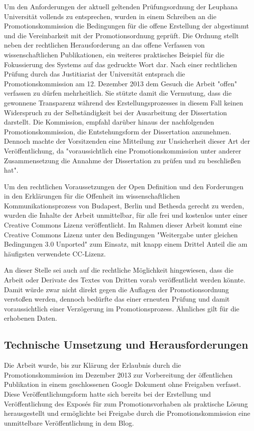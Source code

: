 Um den Anforderungen der aktuell geltenden Prüfungsordnung der Leuphana Universität vollends zu entsprechen, wurden in einem Schreiben an die Promotionskommission die Bedingungen für die offene Erstellung der abgestimmt und die Vereinbarkeit mit der Promotionsordnung geprüft. Die Ordnung stellt neben der rechtlichen Herausforderung an das offene Verfassen von wissenschaftlichen Publikationen, ein weiteres praktisches Beispiel für die Fokussierung des Systems auf das gedruckte Wort dar. Nach einer rechtlichen Prüfung durch das Justitiariat der Universität entsprach die Promotionskommission am 12. Dezember 2013 dem Gesuch die Arbeit "offen" verfassen zu dürfen mehrheitlich. Sie stützte damit die Vermutung, dass die gewonnene Transparenz während des Erstellungsprozesses in diesem Fall keinen Widerspruch zu der Selbständigkeit bei der Ausarbeitung der Dissertation darstellt. Die Kommission, empfahl darüber hinaus der nachfolgenden Promotionskommission, die Entstehungsform der Dissertation anzunehmen. Dennoch machte der Vorsitzenden eine Mitteilung zur Unsicherheit dieser Art der Veröffentlichung, da "voraussichtlich eine Promotionskommission unter anderer Zusammensetzung die Annahme der Dissertation zu prüfen und zu beschließen hat".

Um den rechtlichen Voraussetzungen der Open Definition und den Forderungen in den Erklärungen für die Offenheit im wissenschaftlichen Kommunikationsprozess von Budapest, Berlin und Bethesda gerecht zu werden, wurden die Inhalte der Arbeit unmittelbar, für alle frei und kostenlos unter einer Creative Commons Lizenz veröffentlicht. Im Rahmen dieser Arbeit kommt eine Creative Commons Lizenz unter den Bedingungen "Weitergabe unter gleichen Bedingungen 3.0 Unported" zum Einsatz, mit knapp einem Drittel Anteil die am häufigsten verwendete CC-Lizenz.

An dieser Stelle sei auch auf die rechtliche Möglichkeit hingewiesen, dass die Arbeit oder Derivate des Textes von Dritten vorab veröffentlicht werden könnte. Damit würde zwar nicht direkt gegen die Auflagen der Promotionsordnung verstoßen werden, dennoch bedürfte das einer erneuten Prüfung und damit voraussichtlich einer Verzögerung im Promotionsprozess. Ähnliches gilt für die erhobenen Daten.

\subsection{Technische Umsetzung und Herausforderungen}

Die Arbeit wurde, bis zur Klärung der Erlaubnis durch die Promotionskommission im Dezember 2013 zur Vorbereitung der öffentlichen Publikation in einem geschlossenen Google Dokument ohne Freigaben verfasst. Diese Veröffentlichungsform hatte sich bereits bei der Erstellung und Veröffentlichung des Exposés für zum Promotionsvorhaben \cite{heise_2012_expose} als praktische Lösung herausgestellt und ermöglichte bei Freigabe durch die Promotionskommission eine unmittelbare Veröffentlichung in dem Blog.

